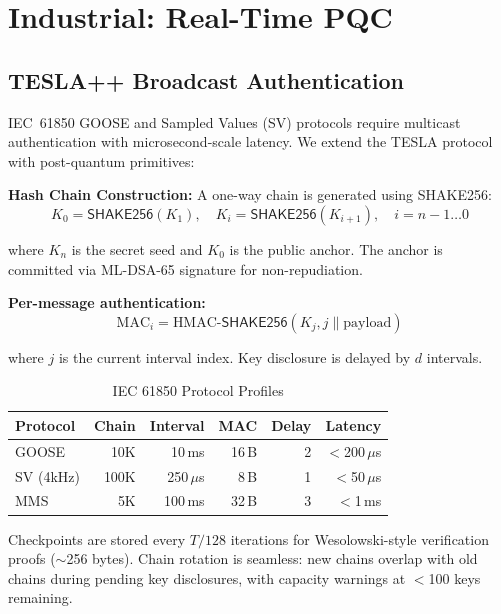 \documentclass[conference,10pt]{IEEEtran}
\newcommand{\mldsa}{\textsf{ML-DSA}}
\newcommand{\shake}{\textsf{SHAKE256}}
\begin{document}
\section{Industrial: Real-Time PQC}
\label{sec:industrial}

\subsection{TESLA++ Broadcast Authentication}

IEC~61850 GOOSE and Sampled Values (SV) protocols require multicast authentication with microsecond-scale latency. We extend the TESLA protocol~\cite{tesla_perrig} with post-quantum primitives:

\textbf{Hash Chain Construction:} A one-way chain is generated using \shake{}:
\begin{equation}
    K_0 = \shake{}(K_1), \quad K_i = \shake{}(K_{i+1}), \quad i = n-1 \ldots 0
\end{equation}

where $K_n$ is the secret seed and $K_0$ is the public anchor. The anchor is committed via \mldsa{}-65 signature for non-repudiation.

\textbf{Per-message authentication:}
\begin{equation}
    \text{MAC}_i = \text{HMAC-}\shake{}(K_j, j \| \text{payload})
\end{equation}

where $j$ is the current interval index. Key disclosure is delayed by $d$ intervals.

\begin{table}[t]
\centering
\caption{IEC 61850 Protocol Profiles}
\label{tab:tesla}
\begin{tabular}{lrrrrr}
\toprule
\textbf{Protocol} & \textbf{Chain} & \textbf{Interval} & \textbf{MAC} & \textbf{Delay} & \textbf{Latency} \\
\midrule
GOOSE & 10K & 10\,ms & 16\,B & 2 & $<$200\,$\mu$s \\
SV (4kHz) & 100K & 250\,$\mu$s & 8\,B & 1 & $<$50\,$\mu$s \\
MMS & 5K & 100\,ms & 32\,B & 3 & $<$1\,ms \\
\bottomrule
\end{tabular}
\end{table}

Checkpoints are stored every $T/128$ iterations for Wesolowski-style verification proofs ($\sim$256 bytes). Chain rotation is seamless: new chains overlap with old chains during pending key disclosures, with capacity warnings at $<$100 keys remaining.
\end{document}
